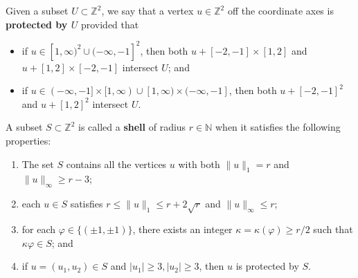\documentclass{article}
\newcommand{\N}{\mathbb{N}}
\newcommand{\bZ}{{\mathbb Z}}
\numberwithin{equation}{section}
\begin{document}
Given a subset $U \subset \bZ^2$, we say that a vertex $u \in \bZ^2$ off the coordinate axes is \textbf{protected by $U$} provided that
\begin{itemize}
    \item 
    if $u \in [1, \infty)^2 \cup (-\infty, -1]^2$, then both $u + [-2, -1] \times [1, 2]$ and $u + [1, 2] \times [-2, -1]$ intersect $U$; and

    \item 
    if $u \in (-\infty, - 1] \times [1, \infty) \cup [1, \infty) \times (-\infty, - 1]$, then both $u + [-2, -1]^2$ and $u + [1, 2]^2$ intersect $U$.
\end{itemize}
A subset $S \subset \bZ^2$ is called a \textbf{shell} of radius $r \in \N$ when it satisfies the following properties:
\begin{enumerate}[leftmargin=1.25cm]
    \item[(SH1)]
    The set $S$ contains all the vertices $u$ with both $\|u\|_1 = r$ and $\|u\|_\infty \geq r - 3$;

    \item[(SH2)]
    each $u \in S$ satisfies $r \leq \|u\|_1 \leq r + 2\sqrt{r}$ and $\|u\|_\infty \leq r$;

    \item[(SH3)]
    for each $\varphi \in \{(\pm 1, \pm 1)\}$, there exists an integer $\kappa = \kappa(\varphi) \geq r / 2$ such that $\kappa \varphi \in S$; and

    \item[(SH4)]
    if $u = (u_1, u_2) \in S$ and $|u_1| \geq 3, |u_2| \geq 3$, then $u$ is protected by $S$.
\end{enumerate}


\end{document}
